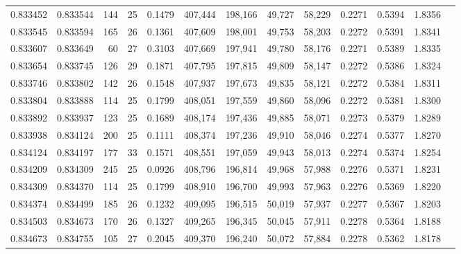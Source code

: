 \begin{tabular}{rrrrrrrrrrrrr}
0.833452 & 0.833544 &   144 &  25 &                                     0.1479 & 407,444 & 198,166 &  49,727 &  58,229 & 0.2271 & 0.5394 & 1.8356 \\
0.833545 & 0.833594 &   165 &  26 &                                     0.1361 & 407,609 & 198,001 &  49,753 &  58,203 & 0.2272 & 0.5391 & 1.8341 \\
0.833607 & 0.833649 &    60 &  27 &                                     0.3103 & 407,669 & 197,941 &  49,780 &  58,176 & 0.2271 & 0.5389 & 1.8335 \\
0.833654 & 0.833745 &   126 &  29 &                                     0.1871 & 407,795 & 197,815 &  49,809 &  58,147 & 0.2272 & 0.5386 & 1.8324 \\
0.833746 & 0.833802 &   142 &  26 &                                     0.1548 & 407,937 & 197,673 &  49,835 &  58,121 & 0.2272 & 0.5384 & 1.8311 \\
0.833804 & 0.833888 &   114 &  25 &                                     0.1799 & 408,051 & 197,559 &  49,860 &  58,096 & 0.2272 & 0.5381 & 1.8300 \\
0.833892 & 0.833937 &   123 &  25 &                                     0.1689 & 408,174 & 197,436 &  49,885 &  58,071 & 0.2273 & 0.5379 & 1.8289 \\
0.833938 & 0.834124 &   200 &  25 &                                     0.1111 & 408,374 & 197,236 &  49,910 &  58,046 & 0.2274 & 0.5377 & 1.8270 \\
0.834124 & 0.834197 &   177 &  33 &                                     0.1571 & 408,551 & 197,059 &  49,943 &  58,013 & 0.2274 & 0.5374 & 1.8254 \\
0.834209 & 0.834309 &   245 &  25 &                                     0.0926 & 408,796 & 196,814 &  49,968 &  57,988 & 0.2276 & 0.5371 & 1.8231 \\
0.834309 & 0.834370 &   114 &  25 &                                     0.1799 & 408,910 & 196,700 &  49,993 &  57,963 & 0.2276 & 0.5369 & 1.8220 \\
0.834374 & 0.834499 &   185 &  26 &                                     0.1232 & 409,095 & 196,515 &  50,019 &  57,937 & 0.2277 & 0.5367 & 1.8203 \\
0.834503 & 0.834673 &   170 &  26 &                                     0.1327 & 409,265 & 196,345 &  50,045 &  57,911 & 0.2278 & 0.5364 & 1.8188 \\
0.834673 & 0.834755 &   105 &  27 &                                     0.2045 & 409,370 & 196,240 &  50,072 &  57,884 & 0.2278 & 0.5362 & 1.8178 \\

\end{tabular}

